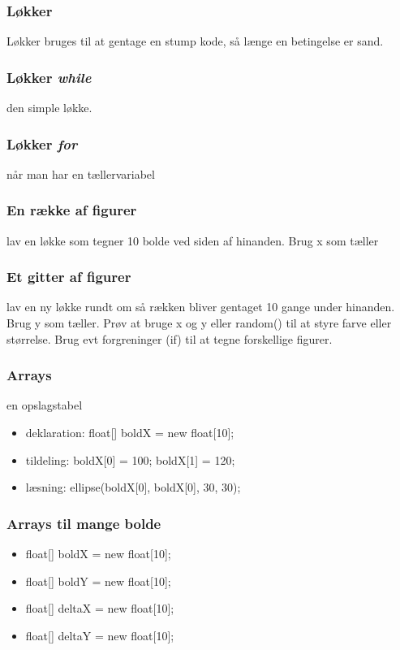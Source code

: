 \documentclass{beamer}
\begin{document}
\begin{frame}[fragile]
  \frametitle{Løkker}
  
  {\tiny Løkker bruges til at gentage en stump kode, så længe en betingelse er sand.}
  
\end{frame}

\begin{frame}[fragile]
  \frametitle{Løkker \emph{while}}
  
  {\tiny den simple løkke.}
  
\end{frame}

\begin{frame}[fragile]
  \frametitle{Løkker \emph{for}}

  {\tiny når man har en tællervariabel}
\end{frame}

\begin{frame}[fragile]
  \frametitle{En række af figurer}

  {\tiny lav en løkke som tegner 10 bolde ved siden af hinanden. Brug x som tæller}
\end{frame}

\begin{frame}[fragile]
  \frametitle{Et gitter af figurer}

  {\tiny lav en ny løkke rundt om så rækken bliver gentaget 10 gange under hinanden. Brug y som tæller. Prøv at bruge x og y eller random() til at styre farve eller størrelse. Brug evt forgreninger (if) til at tegne forskellige figurer. }
\end{frame}


\begin{frame}[fragile]
  \frametitle{Arrays}
  
  {\tiny en opslagstabel}
  \begin{itemize}
  \item deklaration: float[] boldX = new float[10];
  \item tildeling: boldX[0] = 100; boldX[1] = 120;
  \item læsning: ellipse(boldX[0], boldX[0], 30, 30);
  \end{itemize}
  
\end{frame}


\begin{frame}[fragile]
  \frametitle{Arrays til mange bolde}
 
  \begin{itemize}
  \item float[] boldX = new float[10];
  \item float[] boldY = new float[10];
  \item float[] deltaX = new float[10];
  \item float[] deltaY = new float[10];
  \end{itemize}
  
\end{frame}
\end{document}
